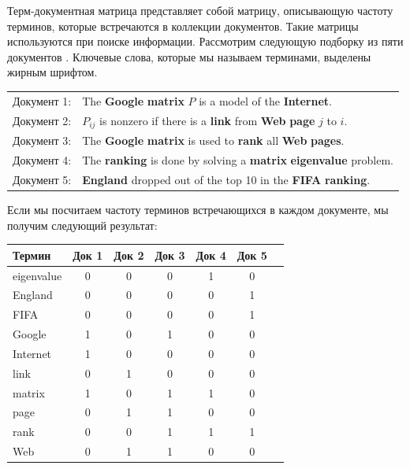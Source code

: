 \documentclass[14pt]{extarticle}
\begin{document}
Терм-документная матрица представляет собой матрицу, описывающую частоту терминов, которые встречаются в коллекции документов. Такие матрицы используются при поиске информации. Рассмотрим следующую подборку из пяти документов \cite{elden}. Ключевые слова, которые мы называем терминами,
выделены жирным шрифтом.

\begin{longtable}{ l p{12cm} }
 Документ 1: & The \textbf{Google} \textbf{matrix} $P$ is a model of the \textbf{Internet}. \\
 Документ 2: & $P_{ij}$ is nonzero if there is a \textbf{link} from \textbf{Web} \textbf{page} $j$ to $i$.\\ 
 Документ 3: & The \textbf{Google} \textbf{matrix} is used to \textbf{rank} all \textbf{Web} \textbf{pages}.\\
 Документ 4: & The \textbf{ranking} is done by solving a \textbf{matrix} \textbf{eigenvalue} problem.\\
 Документ 5: & \textbf{England} dropped out of the top 10 in the \textbf{FIFA} \textbf{ranking}.\\
\end{longtable}

Если мы посчитаем частоту терминов встречающихся в каждом документе, мы получим следующий результат:

\begin{center}
 \begin{tabular}{ l | c c c c c c } 
 Термин      & Док 1 & Док 2 & Док 3 & Док 4 & Док 5 \\
 \hline
 eigenvalue  & 0 & 0 & 0 & 1 & 0 \\ 
 England     & 0 & 0 & 0 & 0 & 1 \\
 FIFA        & 0 & 0 & 0 & 0 & 1 \\ 
 Google      & 1 & 0 & 1 & 0 & 0 \\ 
 Internet    & 1 & 0 & 0 & 0 & 0 \\ 
 link        & 0 & 1 & 0 & 0 & 0 \\ 
 matrix      & 1 & 0 & 1 & 1 & 0 \\
 page        & 0 & 1 & 1 & 0 & 0 \\ 
 rank        & 0 & 0 & 1 & 1 & 1 \\ 
 Web         & 0 & 1 & 1 & 0 & 0 \\
\end{tabular}
\end{center}


\newpage
\end{document}
